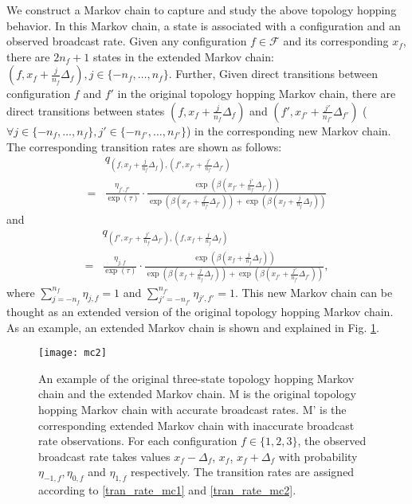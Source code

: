 \documentclass[10pt,conference]{IEEEtran}
\begin{document}
We construct a Markov chain to capture and study the above topology
hopping behavior. In this Markov chain, a state is associated with
a configuration and an observed broadcast rate. Given any configuration
$f\in\mathcal{F}$ and its corresponding $x_{f}$, there are
$2n_{f}+1$ states in the extended Markov chain: $\left(f,x_{f}+\frac{j}{n_{f}}\Delta_{f}\right),j\in\{-n_{f},\ldots,n_{f}\}$.
Further, Given direct transitions between configuration $f$ and $f'$
in the original topology hopping Markov chain, there are direct transitions
between states $(f,x_{f}+\frac{j}{n_{f}}\Delta_{f})$ and $(f',x_{f'}+\frac{j'}{n_{f'}}\Delta_{f'})$
($\forall j\in\{-n_{f},\ldots,n_{f}\},j'\in\{-n_{f'},\ldots,n_{f'}\}$)
in the corresponding new Markov chain. The corresponding transition
rates are shown as follows: \begin{align}
 & q_{(f,x_{f}+\frac{j}{n_{f}}\Delta_{f}),(f',x_{f'}+\frac{j'}{n_{f'}}\Delta_{f'})}\nonumber \\
= & \frac{\eta_{j',f'}}{\exp(\tau)}\cdot\frac{\exp(\beta(x_{f'}+\frac{j'}{n_{f'}}\Delta_{f'}))}{\exp(\beta(x_{f'}+\frac{j'}{n_{f'}}\Delta_{f'}))+\exp(\beta(x_{f}+\frac{j}{n_{f}}\Delta_{f}))}\label{tran_rate_mc1}\end{align}
 and \begin{align}
 & q_{(f',x_{f'}+\frac{j'}{n_{f'}}\Delta_{f'}),(f,x_{f}+\frac{j}{n_{f}}\Delta_{f})}\nonumber \\
= &
\frac{\eta_{j,f}}{\exp(\tau)}\cdot\frac{\exp(\beta(x_{f}+\frac{j}{n_{f}}\Delta_{f}))}{\exp(\beta(x_{f}+\frac{j}{n_{f}}\Delta_{f}))+\exp(\beta(x_{f'}+\frac{j'}{n_{f'}}\Delta_{f'}))}\label{tran_rate_mc2},\end{align}
where $\sum_{j=-n_{f}}^{n_{f}}\eta_{j,f}=1$ and
$\sum_{j'=-n_{f'}}^{n_{f'}}\eta_{j',f'}=1$. This new Markov chain
can be thought as an extended version of the original topology
hopping Markov chain. As an example, an extended Markov chain is
shown and explained in Fig. \ref{mc_inexact}.

\begin{figure}
\centering \texttt{[image: mc2]} \centering
\caption{An example of the original three-state topology hopping Markov chain and the extended Markov chain. M is the original topology
hopping Markov chain with accurate broadcast rates.
M' is the corresponding extended Markov chain with inaccurate broadcast
rate observations. For each configuration $f\in\{1,2,3\}$,
the observed broadcast rate takes values $x_{f}-\Delta_{f}$, $x_{f}$,
$x_{f}+\Delta_{f}$ with probability $\eta_{-1,f},\eta_{0,f}$ and $\eta_{1,f}$
respectively. The transition rates are assigned according to \eqref{tran_rate_mc1} and \eqref{tran_rate_mc2}.
}


\label{mc_inexact}
\end{figure}
\end{document}
